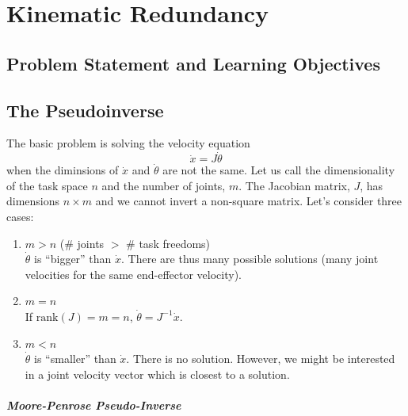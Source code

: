 %

\chapter{Kinematic Redundancy}\label{KinematicRedundancyChapter}

\section{Problem Statement and Learning Objectives}


\section{The Pseudoinverse}


The basic problem is solving the velocity equation
\begin{equation}
\dot{x}=J\dot{\theta}
\end{equation}
when the diminsions of $\dot{x}$ and $\dot{\theta}$ are not the same.
Let us call the dimensionality of the task space $n$ and the number of
joints, $m$.  The Jacobian matrix, $J$, has dimensions $n\times m$ and
we cannot invert a non-square matrix.  Let's consider three cases:
\begin{enumerate}
   \item $m > n$ (\# joints $>$ \# task freedoms) \\
   $\dot{\theta} $ is ``bigger'' than $\dot{x}$.  There are thus many
possible solutions (many joint velocities for the same end-effector
velocity).

    \item $m = n$ \\

    If $\mathrm{rank}(J) = m = n$,  $\dot{\theta} = J^{-1} \dot{x}$.

    \item $m < n$ \\
     $\dot{\theta} $ is ``smaller'' than $\dot{x}$.  There is no
solution.  However, we might be interested in a joint velocity vector
which is closest to a solution.

\end{enumerate}

\paragraph{Moore-Penrose Pseudo-Inverse}

